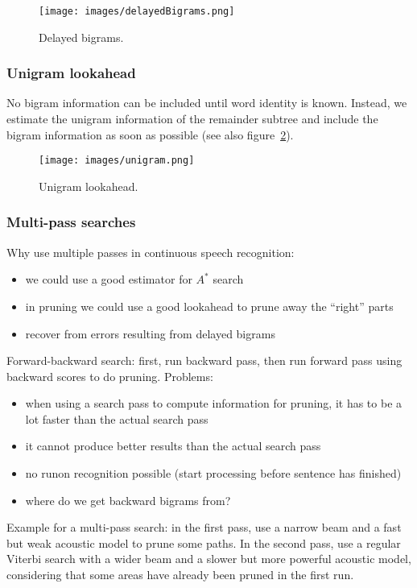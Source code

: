\begin{figure}[htb]
\centering
\texttt{[image: images/delayedBigrams.png]}
\caption{\label{fig:delayedBigrams} Delayed bigrams.}
\end{figure}

\subsubsection{Unigram lookahead}
No bigram information can be included until word identity is known. Instead, we estimate the unigram information of the remainder subtree and include the bigram information as soon as possible (see also figure~\ref{fig:unigramLookahead}).
\begin{figure}[htb]
\centering
\texttt{[image: images/unigram.png]}
\caption{\label{fig:unigramLookahead} Unigram lookahead.}
\end{figure}

\subsubsection{Multi-pass searches}
Why use multiple passes in continuous speech recognition:
\begin{itemize}
    \item we could use a good estimator for $A^{\ast}$ search
    \item in pruning we could use a good lookahead to prune away the ``right'' parts
    \item recover from errors resulting from delayed bigrams
\end{itemize}
Forward-backward search: first, run backward pass, then run forward pass using backward scores to do pruning. Problems:
\begin{itemize}
    \item when using a search pass to compute information for pruning, it has to be a lot faster than the actual search pass
    \item it cannot produce better results than the actual search pass
    \item no runon recognition possible (start processing before sentence has finished)
    \item where do we get backward bigrams from?
\end{itemize}
Example for a multi-pass search: in the first pass, use a narrow beam and a fast but weak acoustic model to prune some paths. In the second pass, use a regular Viterbi search with a wider beam and a slower but more powerful acoustic model, considering that some areas have already been pruned in the first run.

